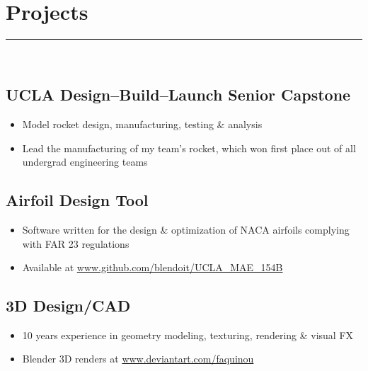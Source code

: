 \documentclass[10pt]{report}
\begin{document}
\section*{Projects}
\rule{\linewidth}{1pt}\\
\subsection*{UCLA Design--Build--Launch Senior Capstone}
\begin{itemize}
    \item Model rocket design, manufacturing, testing \& analysis
    \item Lead the manufacturing of my team's rocket, which won first place out of all undergrad engineering teams
\end{itemize}
\subsection*{Airfoil Design Tool}
\begin{itemize}
    \item Software written for the design \& optimization of NACA airfoils complying with FAR 23 regulations
    \item  Available at \url{www.github.com/blendoit/UCLA_MAE_154B}
\end{itemize}
\subsection*{3D Design/CAD}
\begin{itemize}
    \item 10 years experience in geometry modeling, texturing, rendering \& visual FX
    \item Blender 3D renders at \url{www.deviantart.com/faquinou}
\end{itemize}
\end{document}
